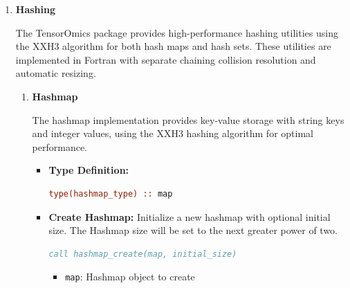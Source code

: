 \begin{enumerate}
\begin{enumerate}
\begin{itemize}
                    \item \texttt{kd\_indices integer(int32)}: k-d tree index array (1-based)
                          
                    \item \texttt{position integer(int32)}: Position in index (1-based)
                  \end{itemize}
                  \textbf{Output:}
                  \begin{itemize}
                    \item \texttt{point\_values real(real64)}: Retrieved point values
                          
                    \item \texttt{ierr integer(int32)}: Error code
                  \end{itemize}
                  \begin{lstlisting}[language=Fortran]
call get_kd_point(points, kd_indices, position, point_values, ierr)
                  \end{lstlisting}
          \end{enumerate}
          \item \textbf{Hashing}
          
          The TensorOmics package provides high-performance hashing utilities using the
          XXH3 algorithm for both hash maps and hash sets. These utilities are
          implemented in Fortran with separate chaining collision resolution and
          automatic resizing.
          
          \begin{enumerate}
            \item \textbf{Hashmap}
                  
                  The hashmap implementation provides key-value storage with string keys
                  and integer values, using the XXH3 hashing algorithm for optimal
                  performance.
                  
                  \begin{itemize}
                    \item \textbf{Type Definition:}
                          \begin{lstlisting}[language=Fortran]
type(hashmap_type) :: map
                          \end{lstlisting}
                          
                    \item \textbf{Create Hashmap:} Initialize a new hashmap with optional initial size. The Hashmap size will be set to the next greater
                          power of two.
                          \begin{lstlisting}[language=Fortran]
call hashmap_create(map, initial_size)
                          \end{lstlisting}
                          \begin{itemize}
                            \item \texttt{map}: Hashmap object to create
                                  

\end{itemize}
\end{itemize}
\end{enumerate}
\end{enumerate}
